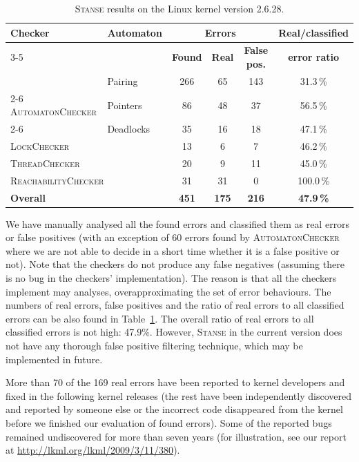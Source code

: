 \documentclass{llncs}
\newcommand{\Stanse}{\textsc{Stanse}\xspace}
\newcommand{\TC}{\textsc{ThreadChecker}\xspace}
\newcommand{\AC}{\textsc{AutomatonChecker}\xspace}
\newcommand{\RC}{\textsc{ReachabilityChecker}\xspace}
\newcommand{\LC}{\textsc{LockChecker}\xspace}
\begin{document}
\begin{table}[tb]
\begin{center}
\setlength{\tabcolsep}{3pt}
\begin{tabular}{|l|l|c|c|c|c|} \hline
\textbf{Checker} & \textbf{Automaton} &
\multicolumn{3}{|c|}{\textbf{Errors}} & \textbf{Real/classified} \\ \cline{3-5}
&&\textbf{Found} & \textbf{Real} & \textbf{False pos.} & \textbf{error ratio}\\ \hline\hline
& Pairing                    & 266 & 65  & 143 & 31.3\,\% \\ \cline{2-6}
\AC & Pointers               & 86  & 48  & 37  & 56.5\,\% \\ \cline{2-6}
& Deadlocks                  & 35  & 16  & 18  & 47.1\,\% \\ \hline
\multicolumn{2}{|l|}{\LC}    & 13  & 6   & 7   & 46.2\,\%  \\ \hline
\multicolumn{2}{|l|}{\TC}    & 20  & 9   & 11  & 45.0\,\% \\ \hline
\multicolumn{2}{|l|}{\RC}    & 31  & 31  & 0   & 100.0\,\%  \\ \hline\hline
\multicolumn{2}{|l|}{\textbf{Overall}}  & \textbf{451} & \textbf{175} &
\textbf{216} & \textbf{47.9\,\%} \\ \hline
\end{tabular}
\end{center}
\caption{\Stanse results on the Linux kernel version 2.6.28.}
\label{tab:results}
\end{table}

We have manually analysed all the found errors and classified them as real
errors or false positives (with an exception of 60 errors found by \AC where
we are not able to decide in a short time whether it is a false positive or
not). Note that the checkers do not produce any false
negatives (assuming there is no bug in the checkers' implementation). The
reason is that all the checkers
implement may analyses, overapproximating the set of error behaviours.  The numbers of real errors, false
positives and the ratio of real errors to all classified errors can be also
found in Table~\ref{tab:results}. The overall ratio of real errors to all
classified errors is not high: 47.9\%.  However, \Stanse in the current
version does not have any thorough false positive filtering technique, which
may be implemented in future.

More than 70 of the 169 real errors have been reported to kernel developers
and fixed in the following kernel releases (the rest have been independently
discovered and reported by someone else or the incorrect code disappeared
from the kernel before we finished our evaluation of found errors). Some of
the reported bugs remained undiscovered for more than seven years (for
illustration, see our report at \url{http://lkml.org/lkml/2009/3/11/380}).
\end{document}
